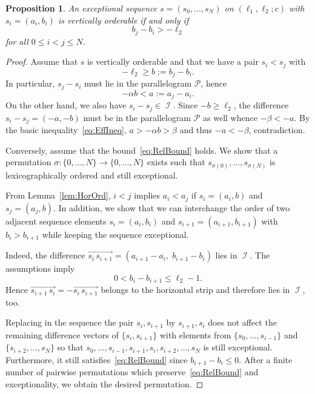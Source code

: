 \documentclass[11pt]{article}
\newtheorem{prop}[theo]{Proposition}
\theoremstyle{definition}
\numberwithin{equation}{section}
\newcommand{\cP}{\mathcal{P}}
\newcommand{\CI}{{\mathcal I}}
\newcommand{\vect}{\overrightarrow}
\newcommand{\nImm}{\operatorname{\CI}}
\newcommand{\xa}{\alpha}
\newcommand{\xb}{\beta}
\newcommand{\cl}{s}
\begin{document}
\begin{prop}
\label{prop:RelCrit}
An exceptional sequence 
$\cl=(\cl_0,\ldots,\cl_N)$ on
$(\ell_1,\ell_2;c)$ with 
$\cl_i=(a_i,b_i)$ is vertically 
orderable if and only if 
\begin{equation}\label{eq:RelBound}
b_j-b_i>-\ell_2
\end{equation}
for all $0\leq i<j\leq N$. 
\end{prop}

\begin{proof}
Assume that $\cl$ is vertically 
orderable and that we have a pair 
$\cl_i<\cl_j$ with
$$
-\ell_2\geq b:=b_j-b_i.
$$
In particular, 
{$\cl_j-\cl_i$ must lie in the parallelogram $\cP$, hence}
$$
-\xa b<a:=a_j-a_i.
$$
On the other hand, we also have 
$\cl_i-\cl_j\in\nImm$. Since 
$-b\geq\ell_2$, the difference 
$\cl_i-\cl_j=(-a,-b)$ must be  
in the parallelogram $\cP$ {as well whence} $-\xb<-a$. By the basic inequality~\eqref{eq:EffIneq}, 
$a>-\xa b>\xb$ {and thus} $-a<-\xb$, 
contradiction.

Conversely, assume that the 
bound~\eqref{eq:RelBound} holds. 
We show that a permutation 
$\sigma\colon \{0,\ldots,N\}\to\{0,\ldots,N\}$ {exists} 
such that 
$\cl_{\sigma(0)},\ldots,\cl_{\sigma(N)}$ 
is lexicographically ordered and still exceptional.

From Lemma~\ref{lem:HorOrd}, $i<j$ 
implies $a_i<a_j$ if $\cl_i=(a_i,b)$ 
and $\cl_j=(a_j,b)$. In addition, we 
show that we can interchange the order 
of two adjacent sequence elements 
$\cl_i=(a_i,b_i)$ and 
$\cl_{i+1}=(a_{i+1},b_{i+1})$ with 
$b_i>b_{i+1}$ while keeping the 
sequence exceptional.

Indeed, the difference 
$\vect{\cl_i\,\cl_{i+1}}=(a_{i+1}-a_i,\; b_{i+1}-b_i)$ 
lies in $\nImm$. The assumptions 
imply
$$
0<b_i-b_{i+1}\leq\ell_2-1.
$$
Hence 
$\vect{\cl_{i+1}\,\cl_i}=-\vect{\cl_i\,\cl_{i+1}}$ 
belongs to the horizontal strip 
and therefore lies in $\nImm$, too.

Replacing in the sequence the 
pair $\cl_i,\cl_{i+1}$ by $\cl_{i+1},\cl_i$ 
does not affect the remaining difference 
vectors of $\{\cl_i,\cl_{i+1}\}$ with 
elements from $\{\cl_0,\ldots,\cl_{i-1}\}$ 
and $\{\cl_{i+2},\ldots,\cl_N\}$ so that 
$\cl_0,\ldots,\cl_{i-1},\cl_{i+1},\cl_i,
\cl_{i+2},\ldots,\cl_N$ is still exceptional. 
Furthermore, it still satisfies~\eqref{eq:RelBound} 
since $b_{i+1}-b_i\leq0$. After a finite 
number of pairwise permutations which 
preserve~\eqref{eq:RelBound} and exceptionality, 
we obtain the desired permutation.
\end{proof}
\end{document}

